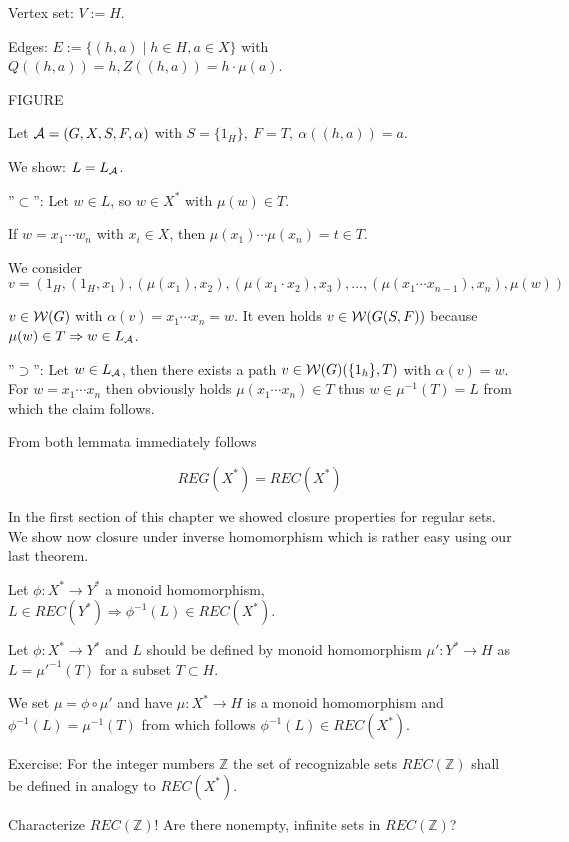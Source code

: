 Vertex set: $V := H$.

Edges: $E := \{ (h, a) \mid h \in H, a \in X \}$ with $Q((h,a)) = h, Z((h,a))
= h \cdot \mu(a)$.

FIGURE

Let $\mbox{$\mathcal{A}$} = (G, X, S, F, \alpha)$ with $S = \{ 1_H \},\ F = T,\ \alpha((h, a))
= a$.

We show: $L = \mbox{$L_{\mathcal{A}}$}$.

''$\subset$'': Let $w \in L$, so $w \in X^*$ with $\mu(w) \in T$.

If $w = x_1 \cdots w_n$ with $x_i \in X$, then $\mu(x_1) \cdots \mu(x_n) = t
\in T$.

We consider \[ v = (1_H, (1_H, x_1), (\mu(x_1), x_2), (\mu(x_1 \cdot x_2),
x_3), \ldots, (\mu(x_1 \cdots x_{n-1}), x_n), \mu(w)) \]

$v \in \mbox{$\mathcal{W}(G)$}$ with $\alpha(v) = x_1 \cdots x_n = w$. It even holds $v \in
\mbox{$\mathcal{W}(G(S, F))$}$ because $\mu(w) \in T \Rightarrow w \in \mbox{$L_{\mathcal{A}}$}$.

''$\supset$'': Let $w \in \mbox{$L_{\mathcal{A}}$}$, then there exists a path $v \in
\mbox{$\mathcal{W}(G)$}(\{1_h\}, T)$ with $\alpha(v) = w$. For $w = x_1 \cdots x_n$ then
obviously holds $\mu(x_1 \cdots x_n) \in T$ thus $w \in \mu^{-1}(T) = L$ from
which the claim follows.

From both lemmata immediately follows

\begin{theorem}
\[ REG(X^*) = REC(X^*) \]
\end{theorem}

In the first section of this chapter we showed closure properties for regular
sets. We show now closure under inverse homomorphism which is rather easy using
our last theorem.

\begin{theorem}
Let $\phi : X^* \to Y^*$ a monoid homomorphism, $L \in REC(Y^*) \Rightarrow
\phi^{-1}(L) \in REC(X^*)$.
\end{theorem}

Let $\phi : X^* \to Y^*$ and $L$ should be defined by monoid homomorphism $\mu'
: Y^* \to H$ as $L = \mu'^{-1}(T)$ for a subset $T \subset H$.

We set $\mu = \phi \circ \mu'$ and have $\mu : X^* \to H$ is a monoid
homomorphism and $\phi^{-1}(L) = \mu^{-1}(T)$ from which follows $\phi^{-1}(L)
\in REC(X^*)$.

Exercise: For the integer numbers $\mathbb{Z}$ the set of recognizable sets
$REC(\mathbb{Z})$ shall be defined in analogy to $REC(X^*)$.

Characterize $REC(\mathbb{Z})$! Are there nonempty, infinite sets in
$REC(\mathbb{Z})$?
